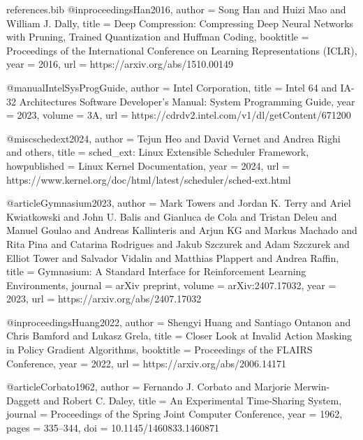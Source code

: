 \begin{filecontents*}{references.bib}
@inproceedings{Han2016,
  author    = {Song Han and Huizi Mao and William J. Dally},
  title     = {Deep Compression: Compressing Deep Neural Networks with Pruning, Trained Quantization and Huffman Coding},
  booktitle = {Proceedings of the International Conference on Learning Representations (ICLR)},
  year      = {2016},
  url       = {https://arxiv.org/abs/1510.00149}
}

@manual{IntelSysProgGuide,
  author    = {{Intel Corporation}},
  title     = {Intel 64 and IA-32 Architectures Software Developer's Manual: System Programming Guide},
  year      = {2023},
  volume    = {3A},
  url       = {https://cdrdv2.intel.com/v1/dl/getContent/671200}
}

@misc{schedext2024,
  author    = {Tejun Heo and David Vernet and Andrea Righi and others},
  title     = {{sched\_ext}: {Linux} Extensible Scheduler Framework},
  howpublished = {Linux Kernel Documentation},
  year      = {2024},
  url       = {https://www.kernel.org/doc/html/latest/scheduler/sched-ext.html}
}

@article{Gymnasium2023,
  author    = {Mark Towers and Jordan K. Terry and Ariel Kwiatkowski and John U. Balis and Gianluca de Cola and Tristan Deleu and Manuel Goulao and Andreas Kallinteris and Arjun KG and Markus Machado and Rita Pina and Catarina Rodrigues and Jakub Szczurek and Adam Szczurek and Elliot Tower and Salvador Vidalin and Matthias Plappert and Andrea Raffin},
  title     = {Gymnasium: A Standard Interface for Reinforcement Learning Environments},
  journal   = {arXiv preprint},
  volume    = {arXiv:2407.17032},
  year      = {2023},
  url       = {https://arxiv.org/abs/2407.17032}
}

@inproceedings{Huang2022,
  author    = {Shengyi Huang and Santiago Ontanon and Chris Bamford and Lukasz Grela},
  title     = {Closer Look at Invalid Action Masking in Policy Gradient Algorithms},
  booktitle = {Proceedings of the FLAIRS Conference},
  year      = {2022},
  url       = {https://arxiv.org/abs/2006.14171}
}

@article{Corbato1962,
  author    = {Fernando J. Corbato and Marjorie Merwin-Daggett and Robert C. Daley},
  title     = {An Experimental Time-Sharing System},
  journal   = {Proceedings of the Spring Joint Computer Conference},
  year      = {1962},
  pages     = {335--344},
  doi       = {10.1145/1460833.1460871}
}



\end{filecontents*}
